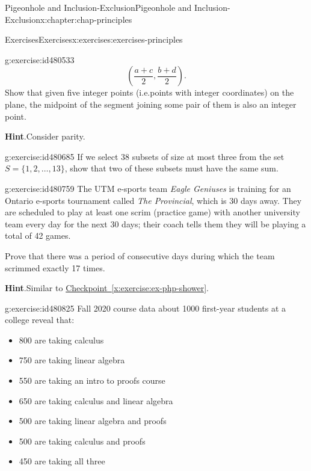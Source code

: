 \documentclass[oneside,10pt,]{book}
\newcommand{\blocktitlefont}{\relax}
\newcommand{\xreffont}{\relax}
\numberwithin{equation}{section}
\begin{document}
\begin{chapterptx}{Pigeonhole and Inclusion-Exclusion}{}{Pigeonhole and Inclusion-Exclusion}{}{}{x:chapter:chap-principles}
\begin{exercises-section}{Exercises}{}{Exercises}{}{}{x:exercises:exercises-principles}
\begin{divisionexercise}{6}{}{}{g:exercise:id480533}
\begin{equation*}
\left(\frac{a+c}{2},\frac{b+d}{2}\right)\text{.}
\end{equation*}
Show that given five integer points (i.e.\@ points with integer coordinates) on the plane, the midpoint of the segment joining some pair of them is also an integer point.%
\par\smallskip%
\noindent\textbf{\blocktitlefont Hint}.\hypertarget{g:hint:id480589}{}\quad{}Consider parity.%
\end{divisionexercise}%
\begin{divisionexercise}{7}{}{}{g:exercise:id480685}%
If we select 38 subsets of size at most three from the set \(S = \{1,2,\ldots,13\}\), show that two of these subsets must have the same sum.%
\end{divisionexercise}%
\begin{divisionexercise}{8}{}{}{g:exercise:id480759}%
The UTM e-sports team \emph{Eagle Geniuses} is training for an Ontario e-sports tournament called \emph{The Provincial}, which is 30 days away. They are scheduled to play at least one scrim (practice game) with another university team every day for the next 30 days; their coach tells them they will be playing a total of 42 games.%
\par
Prove that there was a period of consecutive days during which the team scrimmed exactly 17 times.%
\par\smallskip%
\noindent\textbf{\blocktitlefont Hint}.\hypertarget{g:hint:id480806}{}\quad{}Similar to \hyperref[x:exercise:ex-php-shower]{Checkpoint~{\xreffont\ref{x:exercise:ex-php-shower}}}.%
\end{divisionexercise}%
\begin{divisionexercise}{9}{}{}{g:exercise:id480825}%
Fall 2020 course data about 1000 first-year students at a college reveal that:%
\begin{itemize}[label=\textbullet]
\item{}800 are taking calculus%
\item{}750 are taking linear algebra%
\item{}550 are taking an intro to proofs course%
\item{}650 are taking calculus and linear algebra%
\item{}500 are taking linear algebra and proofs%
\item{}500 are taking calculus and proofs%
\item{}450 are taking all three%
\end{itemize}

\end{divisionexercise}
\end{exercises-section}
\end{chapterptx}
\end{document}
